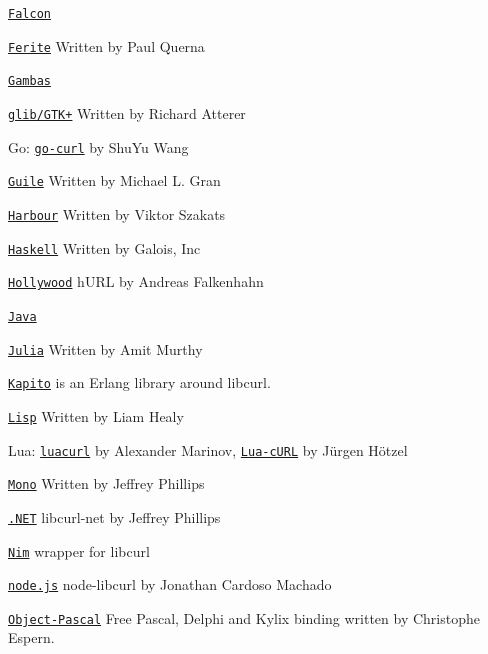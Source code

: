 \href{http://www.falconpl.org/project_docs/curl/}{\texttt{Falcon}}

\href{https://web.archive.org/web/20150102192018/ferite.org/}{\texttt{Ferite}} Written by Paul Querna

\href{https://gambas.sourceforge.net/}{\texttt{Gambas}}

\href{https://web.archive.org/web/20100526203452/atterer.net/glibcurl}{\texttt{glib/\+GTK+}} Written by Richard Atterer

Go\+: \href{https://github.com/andelf/go-curl}{\texttt{go-\/curl}} by Shu\+Yu Wang

\href{https://github.com/spk121/guile-curl}{\texttt{Guile}} Written by Michael L. Gran

\href{https://github.com/vszakats/hb/tree/main/contrib/hbcurl}{\texttt{Harbour}} Written by Viktor Szakats

\href{https://hackage.haskell.org/package/curl}{\texttt{Haskell}} Written by Galois, Inc

\href{https://www.hollywood-mal.com/download.html}{\texttt{Hollywood}} h\+URL by Andreas Falkenhahn

\href{https://github.com/pjlegato/curl-java}{\texttt{Java}}

\href{https://github.com/JuliaWeb/LibCURL.jl}{\texttt{Julia}} Written by Amit Murthy

\href{https://github.com/puzza007/katipo}{\texttt{Kapito}} is an Erlang  library around libcurl.

\href{https://common-lisp.net/project/cl-curl/}{\texttt{Lisp}} Written by Liam Healy

Lua\+: \href{https://web.archive.org/web/20201205052437/luacurl.luaforge.net/}{\texttt{luacurl}} by Alexander Marinov, \href{https://github.com/Lua-cURL}{\texttt{Lua-\/c\+URL}} by Jürgen Hötzel

\href{https://web.archive.org/web/20070606064500/https://forge.novell.com/modules/xfmod/project/?libcurl-mono}{\texttt{Mono}} Written by Jeffrey Phillips

\href{https://sourceforge.net/projects/libcurl-net/}{\texttt{.NET}} libcurl-\/net by Jeffrey Phillips

\href{https://nimble.directory/pkg/libcurl}{\texttt{Nim}} wrapper for libcurl

\href{https://github.com/JCMais/node-libcurl}{\texttt{node.\+js}} node-\/libcurl by Jonathan Cardoso Machado

\href{https://web.archive.org/web/20020610214926/www.tekool.com/opcurl}{\texttt{Object-\/\+Pascal}} Free Pascal, Delphi and Kylix binding written by Christophe Espern.

